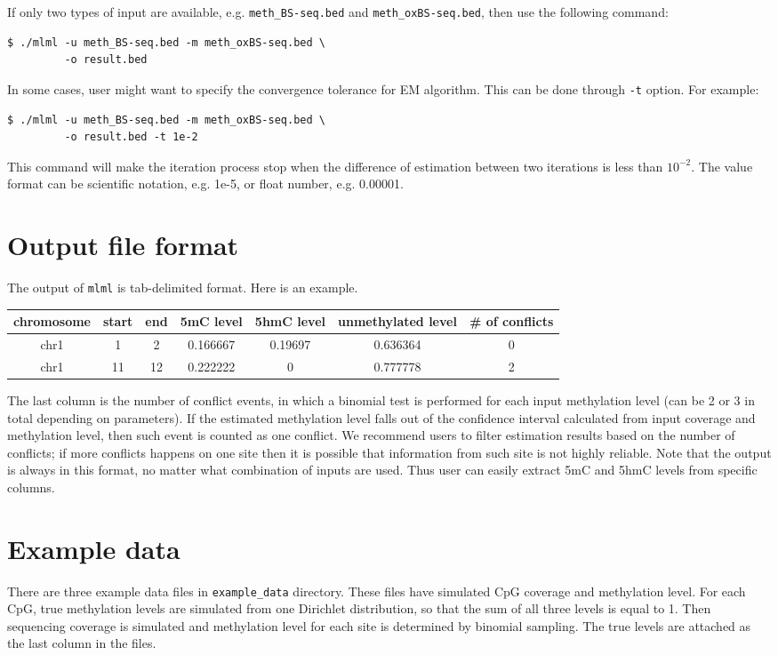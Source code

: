 \documentclass[11pt]{article}
\newcommand{\prog}[1]{\texttt{#1}}
\newcommand{\fn}[1]{\texttt{#1}}
\newcommand{\op}[1]{\texttt{#1}}
\begin{document}
If only two types of input are available, e.g. \fn{meth\_BS-seq.bed} and \fn{meth\_oxBS-seq.bed}, then use the following command:
\begin{verbatim}
$ ./mlml -u meth_BS-seq.bed -m meth_oxBS-seq.bed \
         -o result.bed
\end{verbatim}

In some cases, user might want to specify the convergence tolerance for EM algorithm. This can be done through \op{-t} option. For example:
\begin{verbatim}
$ ./mlml -u meth_BS-seq.bed -m meth_oxBS-seq.bed \
         -o result.bed -t 1e-2
\end{verbatim}
This command will make the iteration process stop when the difference of estimation between two iterations is less than $10^{-2}$. The value format can be scientific notation, e.g. 1e-5, or float number, e.g. 0.00001.

\section{Output file format}	
The output of \prog{mlml} is tab-delimited format. Here is an example.
\begin{table}[h!]
\centering
\begin{tabular}{ccccccc}
chromosome & start & end & 5mC level & 5hmC level & unmethylated level &  \# of conflicts \\
\hline
chr1 & 1 & 2 & 0.166667 & 0.19697 & 0.636364 & 0 \\
chr1 & 11 & 12 & 0.222222 & 0 & 0.777778 & 2\\
\end{tabular}
\end{table}
The last column is the number of conflict events, in which a binomial test is performed for each input methylation level (can be 2 or 3 in total depending on parameters). If the estimated methylation level falls out of the confidence interval calculated from input coverage and methylation level, then such event is counted as one conflict. We recommend users to filter estimation results based on the number of conflicts; if more conflicts happens on one site then it is possible that information from such site is not highly reliable. Note that the output is always in this format, no matter what combination of inputs are used. Thus user can easily extract 5mC and 5hmC levels from specific columns.

\section{Example data}
There are three example data files in \fn{example\_data} directory. These files have simulated CpG coverage and methylation level. For each CpG, true methylation levels are simulated from one Dirichlet distribution, so that the sum of all three levels is equal to 1. Then sequencing coverage is simulated and methylation level for each site is determined by binomial sampling. The true levels are attached as the last column in the files.
\end{document}
